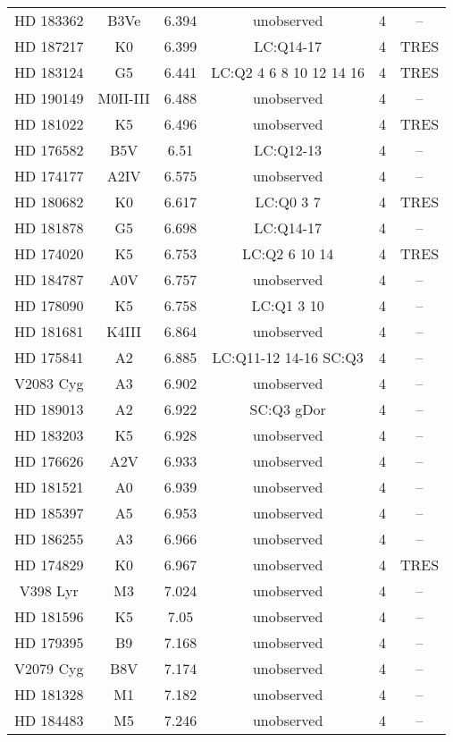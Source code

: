 \begin{table*}
\begin{tabular}{cccccc}
HD 183362 & B3Ve & 6.394 & unobserved & 4 & -- \\
HD 187217 & K0 & 6.399 & LC:Q14-17 & 4 & TRES \\
HD 183124 & G5 & 6.441 & LC:Q2 4 6 8 10 12 14 16 & 4 & TRES \\
HD 190149 & M0II-III & 6.488 & unobserved & 4 & -- \\
HD 181022 & K5 & 6.496 & unobserved & 4 & TRES \\
HD 176582 & B5V & 6.51 & LC:Q12-13 & 4 & -- \\
HD 174177 & A2IV & 6.575 & unobserved & 4 & -- \\
HD 180682 & K0 & 6.617 & LC:Q0 3 7 & 4 & TRES \\
HD 181878 & G5 & 6.698 & LC:Q14-17 & 4 & -- \\
HD 174020 & K5 & 6.753 & LC:Q2 6 10 14 & 4 & TRES \\
HD 184787 & A0V & 6.757 & unobserved & 4 & -- \\
HD 178090 & K5 & 6.758 & LC:Q1 3 10 & 4 & -- \\
HD 181681 & K4III & 6.864 & unobserved & 4 & -- \\
HD 175841 & A2 & 6.885 & LC:Q11-12 14-16 SC:Q3 & 4 & -- \\
V2083 Cyg & A3 & 6.902 & unobserved & 4 & -- \\
HD 189013 & A2 & 6.922 & SC:Q3 gDor & 4 & -- \\
HD 183203 & K5 & 6.928 & unobserved & 4 & -- \\
HD 176626 & A2V & 6.933 & unobserved & 4 & -- \\
HD 181521 & A0 & 6.939 & unobserved & 4 & -- \\
HD 185397 & A5 & 6.953 & unobserved & 4 & -- \\
HD 186255 & A3 & 6.966 & unobserved & 4 & -- \\
HD 174829 & K0 & 6.967 & unobserved & 4 & TRES \\
V398 Lyr & M3 & 7.024 & unobserved & 4 & -- \\
HD 181596 & K5 & 7.05 & unobserved & 4 & -- \\
HD 179395 & B9 & 7.168 & unobserved & 4 & -- \\
V2079 Cyg & B8V & 7.174 & unobserved & 4 & -- \\
HD 181328 & M1 & 7.182 & unobserved & 4 & -- \\
HD 184483 & M5 & 7.246 & unobserved & 4 & -- \\
\hline
\end{tabular}
\end{table*}
